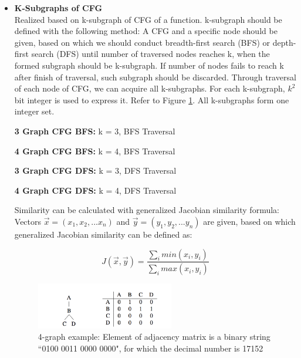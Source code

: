 \begin{itemize}
	
	\item \textbf{K-Subgraphs of CFG} \\
	Realized based on k-subgraph of CFG of a function. k-subgraph should be defined with the following method: A CFG and a specific node should be given, based on which we should conduct breadth-first search (BFS) or depth-first search (DFS) until number of traversed nodes reaches k, when the formed subgraph should be k-subgraph. If number of nodes fails to reach k after finish of traversal, such subgraph should be discarded. Through traversal of each node of CFG, we can acquire all k-subgraphs. For each k-subgraph, $k^2$ bit integer is used to express it. Refer to Figure \ref{fig:graph-ex}. All k-subgraphs form one integer set.
	
	\textbf{3 Graph CFG BFS:} k = 3, BFS Traversal
	
	\textbf{4 Graph CFG BFS:} k = 4, BFS Traversal
	
	\textbf{3 Graph CFG DFS:} k = 3, DFS Traversal
	
	\textbf{4 Graph CFG DFS:} k = 4, DFS Traversal
	
	Similarity can be calculated with generalized Jacobian similarity formula: Vectors $\vec{x}=(x_{1}, x_{2}, ...x_{n})$ and $\vec{y}=(y_{1}, y_{2}, ...y_{n})$ are given, based on which generalized Jacobian similarity can be defined as:
	
	
	\begin{equation}
	J(\vec{x}, \vec{y})=\frac{\sum_imin(x_{i}, y_{i})}{\sum_imax(x_{i}, y_{i})}
	\end{equation}
	
	\begin{figure}[h]
	\centering
	\includegraphics[width=6cm]{./figs/graph-matrix.png}
	\caption{4-graph example: Element of adjacency matrix is a binary string ``0100 0011 0000 0000", for which the decimal number is 17152}
	\label{fig:graph-ex}
	\end{figure}


\end{itemize}

